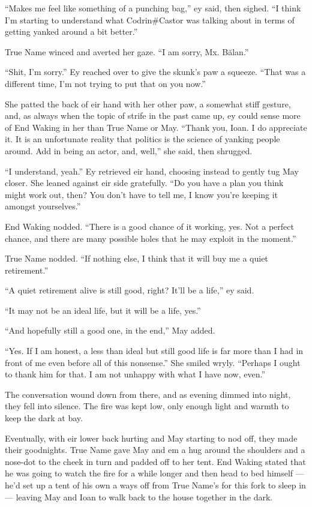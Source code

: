 ``Makes me feel like something of a punching bag,'' ey said, then sighed. ``I think I'm starting to understand what Codrin\#Castor was talking about in terms of getting yanked around a bit better.''

True Name winced and averted her gaze. ``I am sorry, Mx. Bălan.''

``Shit, I'm sorry.'' Ey reached over to give the skunk's paw a squeeze. ``That was a different time, I'm not trying to put that on you now.''

She patted the back of eir hand with her other paw, a somewhat stiff gesture, and, as always when the topic of strife in the past came up, ey could sense more of End Waking in her than True Name or May. ``Thank you, Ioan. I do appreciate it. It is an unfortunate reality that politics is the science of yanking people around. Add in being an actor, and, well,'' she said, then shrugged.

``I understand, yeah.'' Ey retrieved eir hand, choosing instead to gently tug May closer. She leaned against eir side gratefully. ``Do you have a plan you think might work out, then? You don't have to tell me, I know you're keeping it amongst yourselves.''

End Waking nodded. ``There is a good chance of it working, yes. Not a perfect chance, and there are many possible holes that he may exploit in the moment.''

True Name nodded. ``If nothing else, I think that it will buy me a quiet retirement.''

``A quiet retirement alive is still good, right? It'll be a life,'' ey said.

``It may not be an ideal life, but it will be a life, yes.''

``And hopefully still a good one, in the end,'' May added.

``Yes. If I am honest, a less than ideal but still good life is far more than I had in front of me even before all of this nonsense.'' She smiled wryly. ``Perhaps I ought to thank him for that. I am not unhappy with what I have now, even.''

The conversation wound down from there, and as evening dimmed into night, they fell into silence. The fire was kept low, only enough light and warmth to keep the dark at bay.

Eventually, with eir lower back hurting and May starting to nod off, they made their goodnights. True Name gave May and em a hug around the shoulders and a nose-dot to the cheek in turn and padded off to her tent. End Waking stated that he was going to watch the fire for a while longer and then head to bed himself — he'd set up a tent of his own a ways off from True Name's for this fork to sleep in — leaving May and Ioan to walk back to the house together in the dark.

